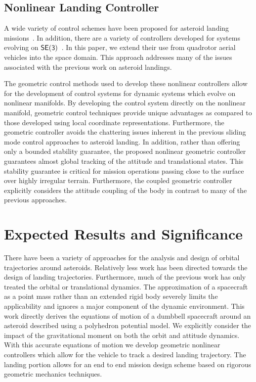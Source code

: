 \documentclass[letterpaper, paper,11pt]{AAS}		%
\begin{document}
\subsection{Nonlinear Landing Controller}\label{sec:landing}

A wide variety of control schemes have been proposed for asteroid landing missions~\cite{furfaro2013,li2011a}.
In addition, there are a  variety of controllers developed for systems evolving on \( \mathsf{SE(3)} \)~\cite{lee2010c, goodarzi2015}.
In this paper, we extend their use from quadrotor aerial vehicles into the space domain. 
This approach addresses many of the issues associated with the previous work on asteroid landings.

The geometric control methods used to develop these nonlinear controllers allow for the development of control systems for dynamic systems which evolve on nonlinear manifolds. 
By developing the control system directly on the nonlinear manifold, geometric control techniques provide unique advantages as compared to those developed using local coordinate representations.
Furthermore, the geometric controller avoids the chattering issues inherent in the previous sliding mode control approaches to asteroid landing.
In addition, rather than offering only a bounded stability guarantee, the proposed nonlinear geometric controller guarantees almost global tracking of the attitude and translational states. 
This stability guarantee is critical for mission operations passing close to the surface over highly irregular terrain.
Furthermore, the coupled geometric controller explicitly considers the attitude coupling of the body in contrast to many of the previous approaches.

\section{Expected Results and Significance}\label{sec:expected}
There have been a variety of approaches for the analysis and design of orbital trajectories around asteroids.
Relatively less work has been directed towards the design of landing trajectories.
Furthermore, much of the previous work has only treated the orbital or translational dynamics.
The approximation of a spacecraft as a point mass rather than an extended rigid body severely limits the applicability and ignores a major component of the dynamic environment.
This work directly derives the equations of motion of a dumbbell spacecraft around an asteroid described using a polyhedron potential model. 
We explicitly consider the impact of the gravitational moment on both the orbit and attitude dynamics. 
With this accurate equations of motion we develop geometric nonlinear controllers which allow for the vehicle to track a desired landing trajectory. 
The landing portion allows for an end to end mission design scheme based on rigorous geometric mechanics techniques.

 
% 

\end{document}
